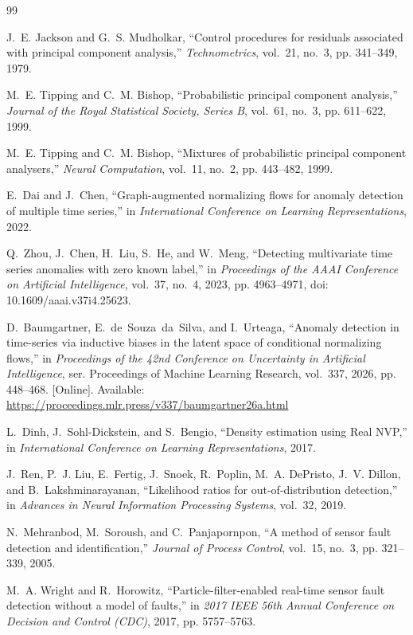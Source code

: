 \documentclass[conference]{IEEEtran}
\newcommand{\1}{\mathbf{1}}
\begin{document}
\begin{thebibliography}{99}

J.~E. Jackson and G.~S. Mudholkar, ``Control procedures for residuals
associated with principal component analysis,'' \emph{Technometrics},
vol.~21, no.~3, pp. 341--349, 1979.

M.~E. Tipping and C.~M. Bishop, ``Probabilistic principal component
analysis,'' \emph{Journal of the Royal Statistical Society, Series B},
vol.~61, no.~3, pp. 611--622, 1999.

M.~E. Tipping and C.~M. Bishop, ``Mixtures of probabilistic principal
component analysers,'' \emph{Neural Computation}, vol.~11, no.~2,
pp. 443--482, 1999.

E.~Dai and J.~Chen, ``Graph-augmented normalizing flows for anomaly
detection of multiple time series,'' in \emph{International Conference
on Learning Representations}, 2022.

Q.~Zhou, J.~Chen, H.~Liu, S.~He, and W.~Meng, ``Detecting multivariate
time series anomalies with zero known label,'' in \emph{Proceedings
of the AAAI Conference on Artificial Intelligence}, vol.~37, no.~4,
2023, pp. 4963--4971, doi: 10.1609/aaai.v37i4.25623.

D.~Baumgartner, E.~de~Souza~da~Silva, and I.~Urteaga,
``Anomaly detection in time-series via inductive biases in the latent
space of conditional normalizing flows,'' in \emph{Proceedings of
the 42nd Conference on Uncertainty in Artificial Intelligence},
ser. Proceedings of Machine Learning Research, vol.~337, 2026,
pp. 448--468. [Online]. Available:
\url{https://proceedings.mlr.press/v337/baumgartner26a.html}

L.~Dinh, J.~Sohl-Dickstein, and S.~Bengio, ``Density estimation using
{Real NVP},'' in \emph{International Conference on Learning
Representations}, 2017.

J.~Ren, P.~J. Liu, E.~Fertig, J.~Snoek, R.~Poplin, M.~A. DePristo,
J.~V. Dillon, and B.~Lakshminarayanan, ``Likelihood ratios for
out-of-distribution detection,'' in \emph{Advances in Neural
Information Processing Systems}, vol.~32, 2019.

N.~Mehranbod, M.~Soroush, and C.~Panjapornpon, ``A method of sensor
fault detection and identification,'' \emph{Journal of Process
Control}, vol.~15, no.~3, pp. 321--339, 2005.

M.~A. Wright and R.~Horowitz, ``Particle-filter-enabled real-time
sensor fault detection without a model of faults,'' in \emph{2017
IEEE 56th Annual Conference on Decision and Control (CDC)}, 2017,
pp. 5757--5763.


\end{thebibliography}
\end{document}
